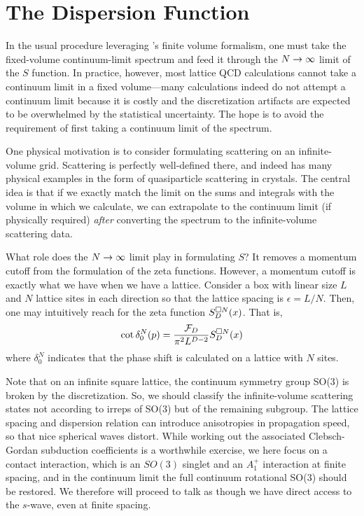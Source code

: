 \section{The Dispersion Function}\label{sec:dispersion}

In the usual procedure leveraging \Luscher's finite volume formalism, one must take the fixed-volume continuum-limit spectrum and feed it through the $N\rightarrow\infty$ limit of the $S$ function.
In practice, however, most lattice QCD calculations cannot take a continuum limit in a fixed volume---many calculations indeed do not attempt a continuum limit because it is costly and the discretization artifacts are expected to be overwhelmed by the statistical uncertainty.
The hope is to avoid the requirement of first taking a continuum limit of the spectrum.

One physical motivation is to consider formulating scattering on an infinite-volume grid.
Scattering is perfectly well-defined there, and indeed has many physical examples in the form of quasiparticle scattering in crystals.
The central idea is that if we exactly match the limit on the sums and integrals with the volume in which we calculate, we can extrapolate to the continuum limit (if physically required) \emph{after} converting the spectrum to the infinite-volume scattering data.

What role does the $N\rightarrow\infty$ limit play in formulating $S$?
It removes a momentum cutoff from the formulation of the zeta functions.
However, a momentum cutoff is exactly what we have when we have a lattice.
Consider a box with linear size $L$ and $N$ lattice sites in each direction so that the lattice spacing is $\epsilon=L/N$.
Then, one may intuitively reach for the zeta function $S_D^{\square N}(x)$.  That is,
\begin{equation}\label{eq:cutoff cartesian S}
    \cot \delta_0^N(p) = \frac{\mathcal{F}_D}{\pi^2 L^{D-2}} S_D^{\square N}(x)
\end{equation}
where $\delta_0^N$ indicates that the phase shift is calculated on a lattice with $N$ sites.

Note that on an infinite square lattice, the continuum symmetry group SO(3) is broken by the discretization.
So, we should classify the infinite-volume scattering states not according to irreps of SO(3) but of the remaining subgroup.
The lattice spacing and dispersion relation can introduce anisotropies in propagation speed, so that nice spherical waves distort.
While working out the associated Clebsch-Gordan subduction coefficients is a worthwhile exercise, we here focus on a contact interaction, which is an $SO(3)$ singlet and an $A_1^+$ interaction at finite spacing, and in the continuum limit the full continuum rotational SO(3) should be restored.
We therefore will proceed to talk as though we have direct access to the $s$-wave, even at finite spacing.

